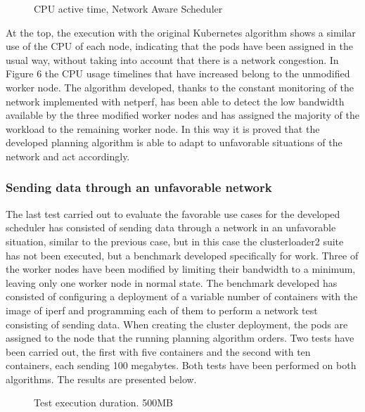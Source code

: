 \documentclass[conference]{IEEEtran}
\begin{document}
\begin{figure}[h]
\begin{center}
\strut{}
\caption{CPU active time, Network Aware Scheduler}\label{fig:cluster}
\end{center}
\end{figure}

At the top, the execution with the original Kubernetes algorithm shows a similar use of the CPU of each node, indicating that the pods have been assigned in the usual way, without taking into account that there is a network congestion. 
In Figure 6 the CPU usage timelines that have increased belong to the unmodified worker node. The algorithm developed, thanks to the constant monitoring of the network implemented with netperf, has 
been able to detect the low bandwidth available by the three modified worker nodes and has assigned the majority of the workload to the remaining worker node. In this way it is proved that the developed 
planning algorithm is able to adapt to unfavorable situations of the network and act accordingly.

\subsubsection{Sending data through an unfavorable network}\label{sec:unfavnet}

The last test carried out to evaluate the favorable use cases for the developed scheduler has consisted of sending data through a network in an unfavorable situation, similar to the previous case, but in 
this case the clusterloader2 suite has not been executed, but a benchmark developed specifically for work. Three of the worker nodes have been modified by limiting their bandwidth to a minimum, leaving 
only one worker node in normal state. The benchmark developed has consisted of configuring a deployment of a variable number of containers with the image of iperf and programming each of them to perform a 
network test consisting of sending data. When creating the cluster deployment, the pods are assigned to the node that the running planning algorithm orders. Two tests have been carried out, the first with 
five containers and the second with ten containers, each sending 100 megabytes. Both tests have been performed on both algorithms. The results are presented below.

\begin{figure}[h]
\begin{center}
\strut{}
\caption{Test execution duration. 500MB}\label{fig:cluster}
\end{center}
\end{figure}
\end{document}

